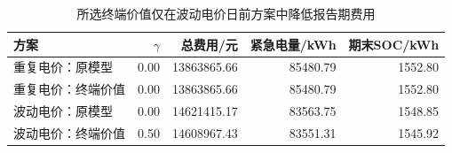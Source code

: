 \begin{table}[H]\centering\small
\caption{所选终端价值仅在波动电价日前方案中降低报告期费用}\label{tab:terminal_results}
\begin{tabular}{lrrrr}\toprule
方案 & $\gamma$ & 总费用/元 & 紧急电量/kWh & 期末SOC/kWh \\\midrule
重复电价：原模型 & 0.00 & 13863865.66 & 85480.79 & 1552.80 \\
重复电价：终端价值 & 0.00 & 13863865.66 & 85480.79 & 1552.80 \\
波动电价：原模型 & 0.00 & 14621415.17 & 83563.75 & 1548.85 \\
波动电价：终端价值 & 0.50 & 14608967.43 & 83551.31 & 1545.92 \\
\bottomrule\end{tabular}\end{table}
